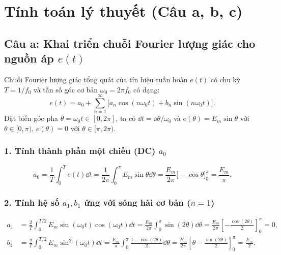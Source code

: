 \section{Tính toán lý thuyết (Câu a, b, c)}

\subsection{Câu a: Khai triển chuỗi Fourier lượng giác cho nguồn áp \texorpdfstring{$e(t)$}{e(t)}}

Chuỗi Fourier lượng giác tổng quát của tín hiệu tuần hoàn $e(t)$ có chu kỳ $T = 1/f_0$ và tần số góc cơ bản $\omega_0 = 2\pi f_0$ có dạng:
\begin{equation}
    e(t) = a_0 + \sum_{n=1}^{\infty} \Big[ a_n \cos(n\omega_0 t) + b_n \sin(n\omega_0 t) \Big].
    \label{eq:fourier_general}
\end{equation}
Đặt biến góc pha $\theta = \omega_0 t \in [0, 2\pi]$, ta có $\dd t = \dd\theta / \omega_0$ và $e(\theta) = E_m \sin\theta$ với $\theta \in [0, \pi)$, $e(\theta) = 0$ với $\theta \in [\pi, 2\pi)$.

\subsubsection*{1. Tính thành phần một chiều (DC) $a_0$}
\begin{equation}
    a_0 = \frac{1}{T}\int_{0}^{T} e(t)\dd t
        = \frac{1}{2\pi}\int_{0}^{\pi} E_m \sin\theta \dd\theta
        = \frac{E_m}{2\pi}\Big[-\cos\theta\Big]_{0}^{\pi}
        = \frac{E_m}{\pi}.
\end{equation}

\subsubsection*{2. Tính hệ số $a_1, b_1$ ứng với sóng hài cơ bản ($n = 1$)}
\begin{align}
    a_1 &= \frac{2}{T}\int_{0}^{T/2} E_m \sin(\omega_0 t)\cos(\omega_0 t)\dd t
         = \frac{E_m}{2\pi}\int_{0}^{\pi} \sin(2\theta)\dd\theta
         = \frac{E_m}{2\pi}\left[-\frac{\cos(2\theta)}{2}\right]_{0}^{\pi} = 0, \\
    b_1 &= \frac{2}{T}\int_{0}^{T/2} E_m \sin^2(\omega_0 t)\dd t
         = \frac{E_m}{\pi}\int_{0}^{\pi} \frac{1 - \cos(2\theta)}{2}\dd\theta
         = \frac{E_m}{2\pi}\left[\theta - \frac{\sin(2\theta)}{2}\right]_{0}^{\pi}
         = \frac{E_m}{2}.
\end{align}

